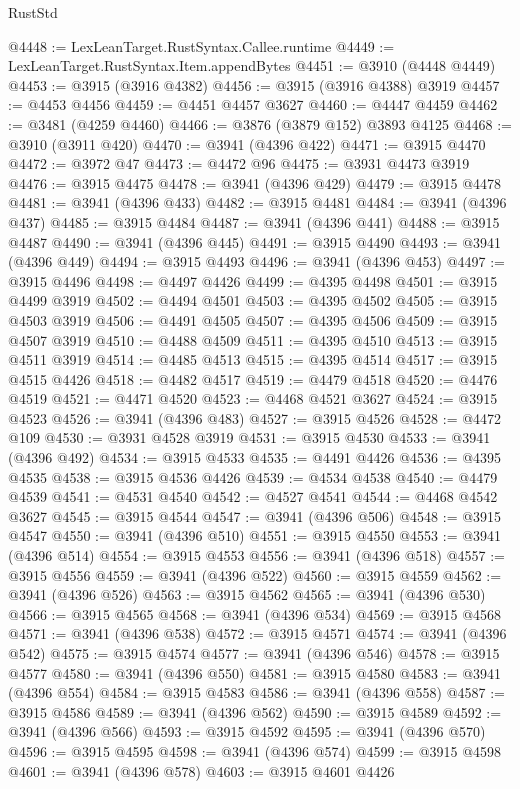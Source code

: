\begin{lexlean}{RustStd}
\begin{coremodule}
@4448 := LexLeanTarget.RustSyntax.Callee.runtime
@4449 := LexLeanTarget.RustSyntax.Item.appendBytes
@4451 := @3910 (@4448 @4449)
@4453 := @3915 (@3916 @4382)
@4456 := @3915 (@3916 @4388) @3919
@4457 := @4453 @4456
@4459 := @4451 @4457 @3627
@4460 := @4447 @4459
@4462 := @3481 (@4259 @4460)
@4466 := @3876 (@3879 @152) @3893 @4125
@4468 := @3910 (@3911 @420)
@4470 := @3941 (@4396 @422)
@4471 := @3915 @4470
@4472 := @3972 @47
@4473 := @4472 @96
@4475 := @3931 @4473 @3919
@4476 := @3915 @4475
@4478 := @3941 (@4396 @429)
@4479 := @3915 @4478
@4481 := @3941 (@4396 @433)
@4482 := @3915 @4481
@4484 := @3941 (@4396 @437)
@4485 := @3915 @4484
@4487 := @3941 (@4396 @441)
@4488 := @3915 @4487
@4490 := @3941 (@4396 @445)
@4491 := @3915 @4490
@4493 := @3941 (@4396 @449)
@4494 := @3915 @4493
@4496 := @3941 (@4396 @453)
@4497 := @3915 @4496
@4498 := @4497 @4426
@4499 := @4395 @4498
@4501 := @3915 @4499 @3919
@4502 := @4494 @4501
@4503 := @4395 @4502
@4505 := @3915 @4503 @3919
@4506 := @4491 @4505
@4507 := @4395 @4506
@4509 := @3915 @4507 @3919
@4510 := @4488 @4509
@4511 := @4395 @4510
@4513 := @3915 @4511 @3919
@4514 := @4485 @4513
@4515 := @4395 @4514
@4517 := @3915 @4515 @4426
@4518 := @4482 @4517
@4519 := @4479 @4518
@4520 := @4476 @4519
@4521 := @4471 @4520
@4523 := @4468 @4521 @3627
@4524 := @3915 @4523
@4526 := @3941 (@4396 @483)
@4527 := @3915 @4526
@4528 := @4472 @109
@4530 := @3931 @4528 @3919
@4531 := @3915 @4530
@4533 := @3941 (@4396 @492)
@4534 := @3915 @4533
@4535 := @4491 @4426
@4536 := @4395 @4535
@4538 := @3915 @4536 @4426
@4539 := @4534 @4538
@4540 := @4479 @4539
@4541 := @4531 @4540
@4542 := @4527 @4541
@4544 := @4468 @4542 @3627
@4545 := @3915 @4544
@4547 := @3941 (@4396 @506)
@4548 := @3915 @4547
@4550 := @3941 (@4396 @510)
@4551 := @3915 @4550
@4553 := @3941 (@4396 @514)
@4554 := @3915 @4553
@4556 := @3941 (@4396 @518)
@4557 := @3915 @4556
@4559 := @3941 (@4396 @522)
@4560 := @3915 @4559
@4562 := @3941 (@4396 @526)
@4563 := @3915 @4562
@4565 := @3941 (@4396 @530)
@4566 := @3915 @4565
@4568 := @3941 (@4396 @534)
@4569 := @3915 @4568
@4571 := @3941 (@4396 @538)
@4572 := @3915 @4571
@4574 := @3941 (@4396 @542)
@4575 := @3915 @4574
@4577 := @3941 (@4396 @546)
@4578 := @3915 @4577
@4580 := @3941 (@4396 @550)
@4581 := @3915 @4580
@4583 := @3941 (@4396 @554)
@4584 := @3915 @4583
@4586 := @3941 (@4396 @558)
@4587 := @3915 @4586
@4589 := @3941 (@4396 @562)
@4590 := @3915 @4589
@4592 := @3941 (@4396 @566)
@4593 := @3915 @4592
@4595 := @3941 (@4396 @570)
@4596 := @3915 @4595
@4598 := @3941 (@4396 @574)
@4599 := @3915 @4598
@4601 := @3941 (@4396 @578)
@4603 := @3915 @4601 @4426

\end{coremodule}
\end{lexlean}
